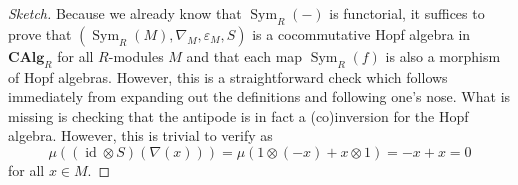 \documentclass{amsart}
\theoremstyle{definition}
\DeclareMathOperator{\sym}{Sym}
\DeclareMathOperator{\id}{id}
\newcommand{\CAlg}[1]{\mathbf{CAlg}_{#1}}
\newcommand{\Sym}[1]{\sym_{#1}}
\let\epsilon\varepsilon
\let\epsilon\varepsilon
\newcommand{\Mod}[1]{{#1}\textnormal{-}\mathbf{Mod}}
\numberwithin{equation}{subsection}
\begin{document}
\begin{proof}[Sketch]
Because we already know that $\Sym{R}(-)$ is functorial, it suffices to prove that $(\Sym{R}(M),\nabla_M,\epsilon_M, S)$ is a cocommutative Hopf algebra in $\CAlg{R}$ for all $R$-modules $M$ and that each map $\Sym{R}(f)$ is also a morphism of Hopf algebras. However, this is a straightforward check which follows immediately from expanding out the definitions and following one's nose. What is missing is checking that the antipode is in fact a (co)inversion for the Hopf algebra. However, this is trivial to verify as 
\[
\mu((\id \otimes S)(\nabla(x))) = \mu(1 \otimes (-x) + x \otimes 1) = -x + x = 0
\] 
for all $x \in M$. %
%

\end{proof}
\end{document}
